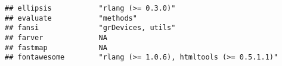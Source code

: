 \documentclass[
]{article}
\begin{document}
\begin{verbatim}
## ellipsis           "rlang (>= 0.3.0)"                                                                                                                                                                                                                                                                                                                                                                                                                           
## evaluate           "methods"                                                                                                                                                                                                                                                                                                                                                                                                                                    
## fansi              "grDevices, utils"                                                                                                                                                                                                                                                                                                                                                                                                                           
## farver             NA                                                                                                                                                                                                                                                                                                                                                                                                                                           
## fastmap            NA                                                                                                                                                                                                                                                                                                                                                                                                                                           
## fontawesome        "rlang (>= 1.0.6), htmltools (>= 0.5.1.1)"                                                                                                                                                                                                                                                                                                                                                                                                   

\end{verbatim}
\end{document}
